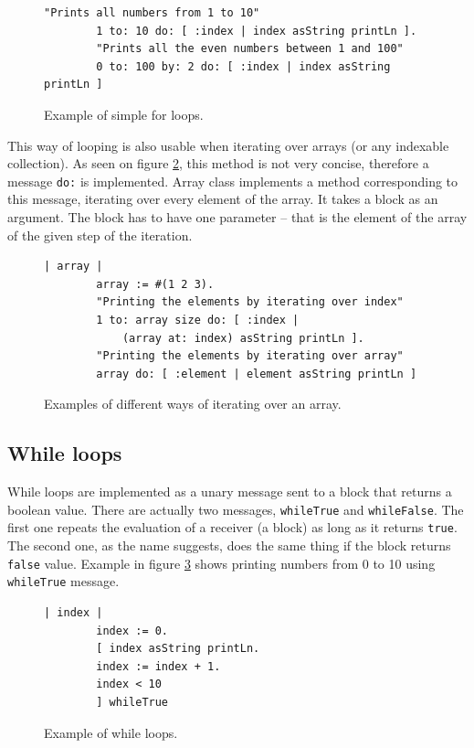 \documentclass[thesis=M,english]{FITthesis}[2019/12/23]
\begin{document}
\begin{figure}[h!]
	\begin{lstlisting}[language=Smalltalk]
		"Prints all numbers from 1 to 10"
		1 to: 10 do: [ :index | index asString printLn ].
		"Prints all the even numbers between 1 and 100"
		0 to: 100 by: 2 do: [ :index | index asString printLn ]
	\end{lstlisting}
	\caption{Example of simple for loops.}
	\label{lst-for-index}
\end{figure}

This way of looping is also usable when iterating over arrays (or any indexable collection). As seen on figure \ref{lst-for-array}, this method is not
very concise, therefore a message \texttt{do:} is implemented. Array class implements a method corresponding to this message, iterating
over every element of the array. It takes a block as an argument. The block has to have one parameter -- that is the element of the array
of the given step of the iteration.

\begin{figure}[h!]
	\begin{lstlisting}[language=Smalltalk]
		| array |
		array := #(1 2 3).
		"Printing the elements by iterating over index"
		1 to: array size do: [ :index |
			(array at: index) asString printLn ].
		"Printing the elements by iterating over array"
		array do: [ :element | element asString printLn ]
	\end{lstlisting}
	\caption{Examples of different ways of iterating over an array.}
	\label{lst-for-array}
\end{figure}

\subsection{While loops}
While loops are implemented as a unary message sent to a block that returns a boolean value. There are actually
two messages, \texttt{whileTrue} and \texttt{whileFalse}. The first one repeats the evaluation of a receiver (a block)
as long as it returns \texttt{true}. The second one, as the name suggests, does the same thing if the block returns
\texttt{false} value. Example in figure \ref{lst-while} shows printing numbers from 0 to 10 using \texttt{whileTrue}
message.

\begin{figure}[h!]
	\begin{lstlisting}[language=Smalltalk]
		| index |
		index := 0.
		[ index asString printLn.
		index := index + 1.
		index < 10
		] whileTrue
	\end{lstlisting}
	\caption{Example of while loops.}
	\label{lst-while}
\end{figure}
\end{document}
